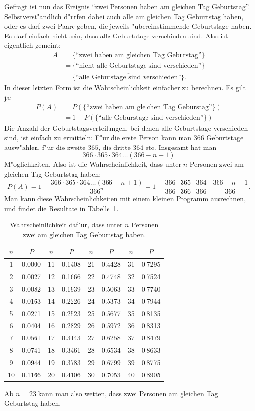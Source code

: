 Gefragt ist nun das Ereignis
``zwei Personen haben am gleichen Tag Geburtstag''.
Selbstverst"andlich d"urfen dabei auch alle am gleichen Tag
Geburtstag haben, oder es darf zwei Paare geben, die jeweils
"ubereinstimmende Geburtstage haben.
Es darf einfach nicht
sein, dass alle Geburtstage verschieden sind.
Also ist eigentlich
gemeint:
\begin{align*}
A&=\{\text{``zwei haben am gleichen Tag Geburstag''}\}\\
&=\{\text{``nicht alle Geburtstage sind verschieden''}\}\\
&=\overline{\{\text{``alle Geburstage sind verschieden''}\}}.
\end{align*}
In dieser letzten Form ist die Wahrscheinlichkeit einfacher zu
berechnen.
Es gilt ja:
\begin{align*}
P(A)&=P(\{\text{``zwei haben am gleichen Tag Geburstag''}\})\\
&=1-P(\{\text{``alle Geburstage sind verschieden''}\})
\end{align*}
Die Anzahl der Geburtstagsverteilungen, bei denen alle Geburtstage
verschieden sind, ist einfach zu ermitteln: F"ur die erste Person
kann man $366$ Geburtstage ausw"ahlen, f"ur die zweite $365$, die
dritte $364$ etc.
Insgesamt hat man
\[
366\cdot365\cdot364\dots(366-n+1)
\]
M"oglichkeiten.
Also ist die Wahrscheinlichkeit, dass unter $n$
Personen zwei am gleichen Tag Geburtstag haben:
\[
P(A)
=
1-\frac{366\cdot365\cdot364\dots(366-n+1)}{366^n}
=
1-\frac{366}{366}\cdot
\frac{365}{366}\cdot
\frac{364}{366}
\cdots
\frac{366-n+1}{366}
.
\]
Man kann diese Wahrscheinlichkeiten mit einem kleinen Programm
ausrechnen, und findet die Resultate in
Tabelle~\ref{geburtstagswahrscheinlichkeit}.
\begin{table}
\begin{center}
\begin{tabular}{|c|c|c|c|c|c|c|c|}
\hline
$n$&$P$&$n$&$P$&$n$&$P$&$n$&$P$\\
\hline
1&0.0000
&11&0.1408
&21&0.4428
&31&0.7295\\
2&0.0027
&12&0.1666
&22&0.4748
&32&0.7524\\
3&0.0082
&13&0.1939
&23&0.5063
&33&0.7740\\
4&0.0163
&14&0.2226
&24&0.5373
&34&0.7944\\
5&0.0271
&15&0.2523
&25&0.5677
&35&0.8135\\
6&0.0404
&16&0.2829
&26&0.5972
&36&0.8313\\
7&0.0561
&17&0.3143
&27&0.6258
&37&0.8479\\
8&0.0741
&18&0.3461
&28&0.6534
&38&0.8633\\
9&0.0944
&19&0.3783
&29&0.6799
&39&0.8775\\
10&0.1166
&20&0.4106
&30&0.7053
&40&0.8905\\
\hline
\end{tabular}
\end{center}
\caption{Wahrscheinlichkeit daf"ur, dass unter $n$ Personen zwei
am gleichen Tag Geburtstag haben.\label{geburtstagswahrscheinlichkeit}}
\end{table}
Ab $n=23$ kann man also wetten, dass zwei Personen am gleichen Tag
Geburtstag haben.

